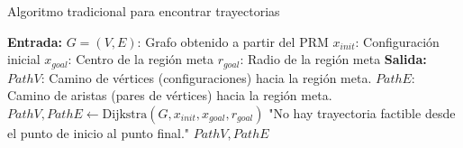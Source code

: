 \documentclass[spanish,mexico]{article}
\numberwithin{equation}{section}
\theoremstyle{definition}
\theoremstyle{remark}
\begin{document}
\begin{algorithm}
\caption{Algoritmo tradicional para encontrar trayectorias}
\begin{algorithmic}[1]
\State \textbf{Entrada:} 
\State \hspace{\algorithmicindent} $G = (V, E)$: Grafo obtenido a partir del PRM
\State \hspace{\algorithmicindent} $x_{init}$: Configuración inicial
\State \hspace{\algorithmicindent} $x_{goal}$: Centro de la región meta
\State \hspace{\algorithmicindent} $r_{goal}$: Radio de la región meta
\State \textbf{Salida:} 
\State \hspace{\algorithmicindent} $PathV$: Camino de vértices (configuraciones) hacia la región meta.  
\State \hspace{\algorithmicindent} $PathE$: Camino de aristas (pares de vértices) hacia la región meta.
\vspace{3.5mm}
    \State $PathV, PathE \gets \text{Dijkstra}(G, x_{init}, x_{goal}, r_{goal})$
    \vspace{1.5mm}
        \State {} "No hay trayectoria factible desde el punto de inicio al punto final."
    \EndIf
    \vspace{1.5mm}
    \State \Return $PathV, PathE$
\EndFunction
\end{algorithmic}
\end{algorithm}
\end{document}
